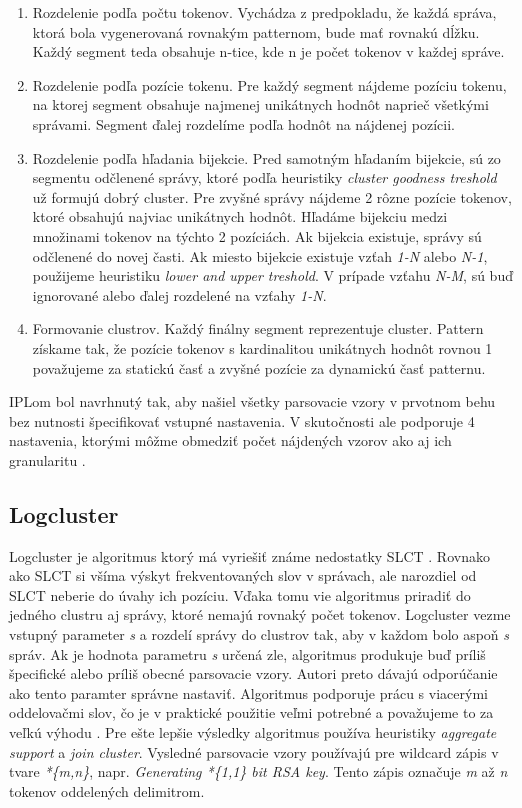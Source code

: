 \begin{enumerate}
  \item Rozdelenie podľa počtu tokenov. Vychádza z predpokladu, že každá správa, ktorá bola vygenerovaná rovnakým patternom, bude mať rovnakú dĺžku. Každý segment teda obsahuje n-tice, kde n je počet tokenov v každej správe.
  \item Rozdelenie podľa pozície tokenu. Pre každý segment nájdeme pozíciu tokenu, na ktorej segment obsahuje najmenej unikátnych hodnôt naprieč všetkými správami. Segment ďalej rozdelíme podľa hodnôt na nájdenej pozícii.
  \item Rozdelenie podľa hľadania bijekcie. Pred samotným hľadaním bijekcie, sú zo segmentu odčlenené správy, ktoré podľa heuristiky \emph{cluster goodness treshold} už formujú dobrý cluster. Pre zvyšné správy nájdeme 2 rôzne pozície tokenov, ktoré obsahujú najviac unikátnych hodnôt. Hľadáme bijekciu medzi množinami tokenov na týchto 2 pozíciách. Ak bijekcia existuje, správy sú odčlenené do novej časti. Ak miesto bijekcie existuje vzťah \emph{1-N} alebo \emph{N-1}, použijeme heuristiku \emph{lower and upper treshold}. V prípade vzťahu \emph{N-M}, sú buď ignorované alebo ďalej rozdelené na vzťahy \emph{1-N}.
  \item Formovanie clustrov. Každý finálny segment reprezentuje cluster. Pattern získame tak, že pozície tokenov s kardinalitou unikátnych hodnôt rovnou 1 považujeme za statickú časť a zvyšné pozície za dynamickú časť patternu.
\end{enumerate}

IPLom bol navrhnutý tak, aby našiel všetky parsovacie vzory v prvotnom behu bez nutnosti špecifikovať vstupné nastavenia. V skutočnosti ale podporuje 4 nastavenia, ktorými môžme obmedziť počet nájdených vzorov ako aj ich granularitu \parencite{nagappanvouk}.

\subsection{Logcluster}

Logcluster je algoritmus ktorý má vyriešiť známe nedostatky SLCT \parencite{logcluster}. Rovnako ako SLCT si všíma výskyt frekventovaných slov v správach, ale narozdiel od SLCT neberie do úvahy ich pozíciu. Vďaka tomu vie algoritmus priradiť do jedného clustru aj správy, ktoré nemajú rovnaký počet tokenov. Logcluster vezme vstupný parameter \emph{s}  a rozdelí správy do clustrov tak, aby v každom bolo aspoň \emph{s} správ. Ak je hodnota parametru \emph{s} určená zle, algoritmus produkuje buď príliš špecifické alebo príliš obecné parsovacie vzory. Autori preto dávajú odporúčanie ako tento paramter správne nastaviť. Algoritmus podporuje prácu s viacerými oddelovačmi slov, čo je v praktické použitie veľmi potrebné a považujeme to za veľkú výhodu \parencite{logclustertool}. Pre ešte lepšie výsledky algoritmus používa heuristiky \emph{aggregate \, support} a \emph{join cluster}. Vysledné parsovacie vzory používajú pre wildcard zápis v tvare \emph{*\{m,n\}}, napr. \emph{Generating *\{1,1\} bit RSA key}. Tento zápis označuje \emph{m} až \emph{n} tokenov oddelených delimitrom.


